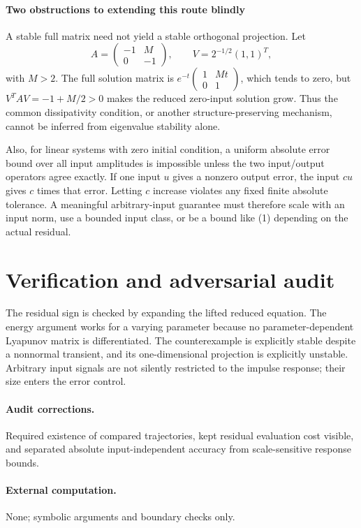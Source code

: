\documentclass[11pt]{article}
\begin{document}
\paragraph{Two obstructions to extending this route blindly}
A stable full matrix need not yield a stable orthogonal projection. Let
\[
 A=\begin{pmatrix}-1&M\\0&-1\end{pmatrix},\qquad
 V=2^{-1/2}(1,1)^T,
\]
with $M>2$. The full solution matrix is $e^{-t}\begin{pmatrix}1&Mt\\0&1\end{pmatrix}$, which tends to zero, but $V^TAV=-1+M/2>0$ makes the reduced zero-input solution grow. Thus the common dissipativity condition, or another structure-preserving mechanism, cannot be inferred from eigenvalue stability alone.

Also, for linear systems with zero initial condition, a uniform absolute error bound over all input amplitudes is impossible unless the two input/output operators agree exactly. If one input $u$ gives a nonzero output error, the input $cu$ gives $c$ times that error. Letting $c$ increase violates any fixed finite absolute tolerance. A meaningful arbitrary-input guarantee must therefore scale with an input norm, use a bounded input class, or be a bound like (1) depending on the actual residual.

\section{Verification and adversarial audit}
The residual sign is checked by expanding the lifted reduced equation. The energy argument works for a varying parameter because no parameter-dependent Lyapunov matrix is differentiated. The counterexample is explicitly stable despite a nonnormal transient, and its one-dimensional projection is explicitly unstable. Arbitrary input signals are not silently restricted to the impulse response; their size enters the error control.
\paragraph{Audit corrections.} Required existence of compared trajectories, kept residual evaluation cost visible, and separated absolute input-independent accuracy from scale-sensitive response bounds.
\paragraph{External computation.} None; symbolic arguments and boundary checks only.
\end{document}
